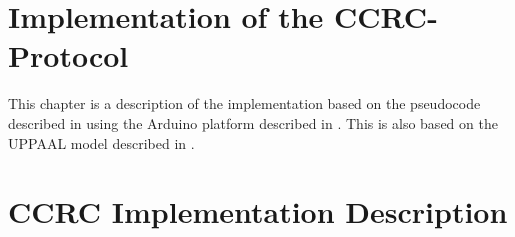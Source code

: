 \section{Implementation of the CCRC-Protocol}
This chapter is a description of the implementation based on the pseudocode described in  using the Arduino platform described in . 
This is also based on the UPPAAL model described in .
\section{CCRC Implementation Description}


